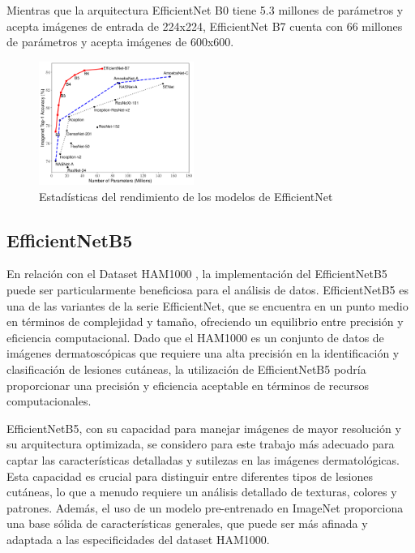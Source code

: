Mientras que la arquitectura EfficientNet B0 tiene 5.3 millones de parámetros y acepta imágenes de entrada de 224x224, EfficientNet B7 cuenta con 66 millones de parámetros y acepta imágenes de 600x600. 

\begin{figure}[ht]%
   \begin{center}
   \includegraphics[width=0.45\textwidth]{./Graphics/efficientnet_performance.png}
   \caption{Estadísticas del rendimiento de los modelos de EfficientNet}
   \label{fig:efficientnet_performance}
   \end{center}
   \end{figure}

\subsection{EfficientNetB5}

En relación con el Dataset HAM1000 , la implementación del EfficientNetB5 puede ser particularmente beneficiosa para el análisis de datos. EfficientNetB5 es una de las variantes de la serie EfficientNet, que se encuentra en un punto medio en términos de complejidad y tamaño, ofreciendo un equilibrio entre precisión y eficiencia computacional. Dado que el HAM1000 es un conjunto de datos de imágenes dermatoscópicas que requiere una alta precisión en la identificación y clasificación de lesiones cutáneas, la utilización de EfficientNetB5 podría proporcionar una precisión y eficiencia aceptable en términos de recursos computacionales.

EfficientNetB5, con su capacidad para manejar imágenes de mayor resolución y su arquitectura optimizada, se considero para este trabajo más adecuado para captar las características detalladas y sutilezas en las imágenes dermatológicas. Esta capacidad es crucial para distinguir entre diferentes tipos de lesiones cutáneas, lo que a menudo requiere un análisis detallado de texturas, colores y patrones. Además, el uso de un modelo pre-entrenado en ImageNet proporciona una base sólida de características generales, que puede ser más afinada y adaptada a las especificidades del dataset HAM1000.

